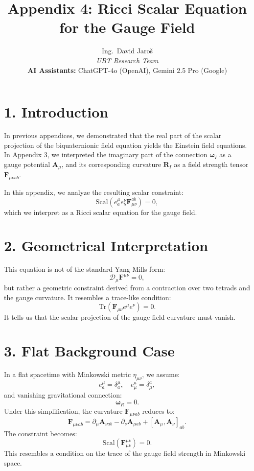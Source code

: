 \documentclass[12pt]{article}
\title{Appendix 4: Ricci Scalar Equation for the Gauge Field}
\author{
Ing.~David Jaroš \\
\textit{UBT Research Team} \\
\textbf{AI Assistants:} ChatGPT-4o (OpenAI), Gemini 2.5 Pro (Google) \\
}
\date{}
\begin{document}
\maketitle

\section*{1. Introduction}

In previous appendices, we demonstrated that the real part of the scalar projection of the biquaternionic field equation yields the Einstein field equations. In Appendix 3, we interpreted the imaginary part of the connection \(\boldsymbol{\omega}_I\) as a gauge potential \(\mathbf{A}_\mu\), and its corresponding curvature \(\mathbf{R}_I\) as a field strength tensor \(\mathbf{F}_{\mu\nu ab}\).

In this appendix, we analyze the resulting scalar constraint:
\[
\text{Scal}(e^\mu_a e^\nu_b \mathbf{F}_{\mu\nu}^{ab}) = 0,
\]
which we interpret as a Ricci scalar equation for the gauge field.

\section*{2. Geometrical Interpretation}

This equation is not of the standard Yang-Mills form:
\[
\mathcal{D}_\mu \mathbf{F}^{\mu\nu} = 0,
\]
but rather a geometric constraint derived from a contraction over two tetrads and the gauge curvature. It resembles a trace-like condition:
\[
\mathrm{Tr}(\mathbf{F}_{\mu\nu} e^\mu e^\nu) = 0.
\]
It tells us that the scalar projection of the gauge field curvature must vanish.

\section*{3. Flat Background Case}

In a flat spacetime with Minkowski metric \( \eta_{\mu\nu} \), we assume:
\[
e^\mu_a = \delta^\mu_a, \quad e^a_\mu = \delta^a_\mu,
\]
and vanishing gravitational connection:
\[
\boldsymbol{\omega}_R = 0.
\]
Under this simplification, the curvature \(\mathbf{F}_{\mu\nu ab}\) reduces to:
\[
\mathbf{F}_{\mu\nu ab} = \partial_\mu \mathbf{A}_{\nu ab} - \partial_\nu \mathbf{A}_{\mu ab} + [\mathbf{A}_{\mu}, \mathbf{A}_{\nu}]_{ab}.
\]
The constraint becomes:
\[
\text{Scal}(\mathbf{F}_{\mu\nu}^{\mu\nu}) = 0.
\]
This resembles a condition on the trace of the gauge field strength in Minkowski space.
\end{document}
